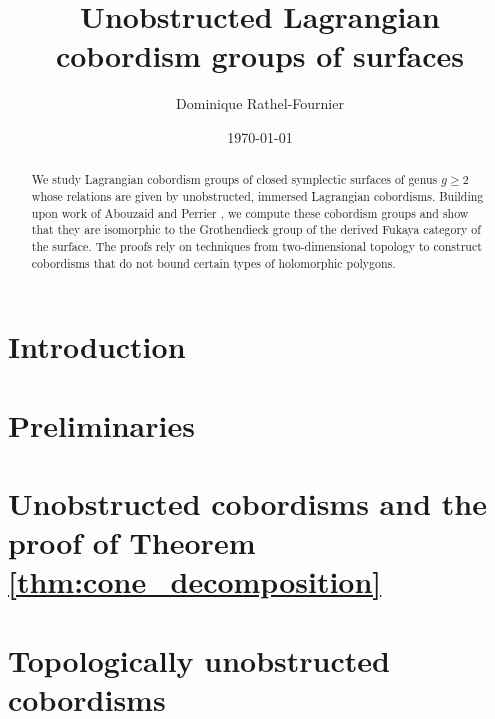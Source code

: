 \documentclass[12pt,reqno]{amsart}
\author{Dominique Rathel-Fournier}
\title{Unobstructed Lagrangian cobordism groups of surfaces}
\date{\today}
\theoremstyle{plain}
\theoremstyle{definition}
\theoremstyle{remark}
\begin{document}
\begin{abstract}
	We study Lagrangian cobordism groups of closed symplectic surfaces of genus $g \geq 2$ whose relations
	are given by unobstructed, immersed Lagrangian cobordisms. 
	Building upon work of Abouzaid \cite{Abouzaid08} and Perrier \cite{Perrier19},
	we compute these cobordism groups and show that they are isomorphic to the Grothendieck group of the derived Fukaya category of the surface.
	The proofs rely on techniques from two-dimensional topology to construct cobordisms
	that do not bound certain types of holomorphic polygons.
\end{abstract}

\maketitle

\thispagestyle{empty}

\tableofcontents

\section{Introduction}
\label{section:intro}



\section{Preliminaries}
\label{section:preliminaries}




\section{Unobstructed cobordisms and the proof of Theorem \ref{thm:cone_decomposition}}
\label{section:fukaya_cob}



\section{Topologically unobstructed cobordisms}
\label{section:top_unob_cobordisms}



\end{document}
